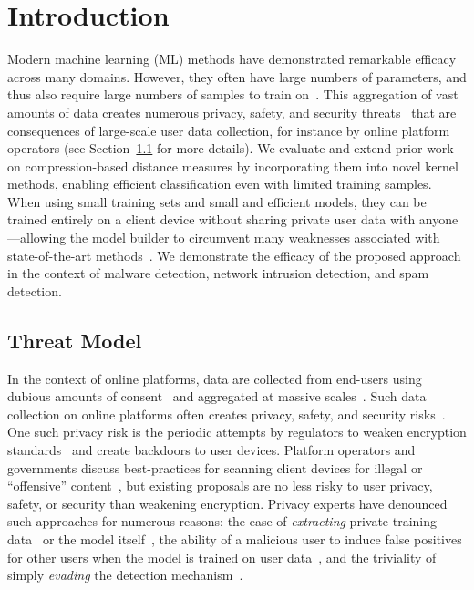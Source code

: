 \documentclass[preprint,12pt]{article}
\begin{document}
\section{Introduction}

Modern machine learning (ML) methods have demonstrated remarkable efficacy across many domains.
However, they often have large numbers of parameters, and thus also require large numbers of samples to train on~\cite{desislavov2021compute}.
This aggregation of vast amounts of data creates numerous privacy, safety, and security threats~\cite{chat_control} that are consequences of large-scale user data collection, for instance by online platform operators (see Section~\ref{threat} for more details).
We evaluate and extend prior work on compression-based distance measures by incorporating them into novel kernel methods, enabling efficient classification even with limited training samples.
When using small training sets and small and efficient models, they can be trained entirely on a client device without sharing private user data with anyone---allowing the model builder to circumvent many weaknesses associated with state-of-the-art methods~\cite{chat_control,power_consumption_ai,desislavov2021compute}.
We demonstrate the efficacy of the proposed approach in the context of malware detection, network intrusion detection, and spam detection.

\subsection{Threat Model}
\label{threat}

In the context of online platforms, data are collected from end-users using dubious amounts of consent~\cite{nouwens2020dark} and aggregated at massive scales~\cite{desislavov2021compute}.
Such data collection on online platforms often creates privacy, safety, and security risks~\cite{chakraborty_adversarial_2018,meyers}.
One such privacy risk is the periodic attempts by regulators to weaken encryption standards~\cite{amnesty_encryption} and create backdoors to user devices.
Platform operators and governments discuss best-practices for scanning client devices for illegal or ``offensive'' 
content~\cite{chat_control,apple_csam}, but existing proposals are no less risky to user privacy, safety, or security than weakening encryption.
Privacy experts have denounced such approaches for numerous reasons: the ease of \textit{extracting} private training data~\cite{choquette2021label,fredrikson_model_2015,li2021membership} or the model itself~\cite{fredrikson_model_2015,orekondy2019knockoff,jagielski2020high,correia2018copycat,shokri2017membership}, the ability of a malicious user to induce false positives for other users when the model is trained on user data~\cite[\textit{poisoning} attacks;][]{rawat2022devil,shokri2020bypassing,gu2017badnets,saha2020hidden,aghakhani2021bullseye,turner2018clean,shafahi2018poison,geiping2020witches,souri2022sleeper}, and the triviality of simply \textit{evading} the detection mechanism~\cite{carlini_towards_2017,dohmatob_generalized_2019,hopskipjump,biggio_evasion_2013,meyers,chakraborty_adversarial_2018,deepfool,hopskipjump}.
\end{document}
